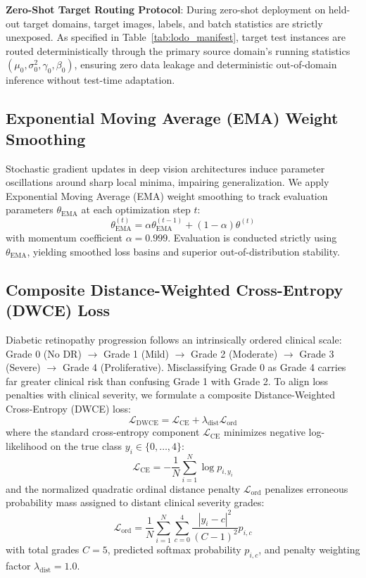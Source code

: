 \documentclass[conference]{IEEEtran}
\begin{document}
\textbf{Zero-Shot Target Routing Protocol}: During zero-shot deployment on held-out target domains, target images, labels, and batch statistics are strictly unexposed. As specified in Table~\ref{tab:lodo_manifest}, target test instances are routed deterministically through the primary source domain's running statistics $(\mu_0, \sigma_0^2, \gamma_0, \beta_0)$, ensuring zero data leakage and deterministic out-of-domain inference without test-time adaptation.

\subsection{Exponential Moving Average (EMA) Weight Smoothing}
Stochastic gradient updates in deep vision architectures induce parameter oscillations around sharp local minima, impairing generalization. We apply Exponential Moving Average (EMA) weight smoothing to track evaluation parameters $\theta_{\text{EMA}}$ at each optimization step $t$:
\begin{equation}
\theta_{\text{EMA}}^{(t)} = \alpha \theta_{\text{EMA}}^{(t-1)} + (1 - \alpha) \theta^{(t)}
\end{equation}
with momentum coefficient $\alpha = 0.999$. Evaluation is conducted strictly using $\theta_{\text{EMA}}$, yielding smoothed loss basins and superior out-of-distribution stability.

\subsection{Composite Distance-Weighted Cross-Entropy (DWCE) Loss}
Diabetic retinopathy progression follows an intrinsically ordered clinical scale: Grade 0 (No DR) $\rightarrow$ Grade 1 (Mild) $\rightarrow$ Grade 2 (Moderate) $\rightarrow$ Grade 3 (Severe) $\rightarrow$ Grade 4 (Proliferative). Misclassifying Grade 0 as Grade 4 carries far greater clinical risk than confusing Grade 1 with Grade 2. To align loss penalties with clinical severity, we formulate a composite Distance-Weighted Cross-Entropy (DWCE) loss:
\begin{equation}
    \mathcal{L}_{\text{DWCE}} = \mathcal{L}_{\text{CE}} + \lambda_{\text{dist}} \mathcal{L}_{\text{ord}}
    \label{eq:dwce_composite}
\end{equation}
where the standard cross-entropy component $\mathcal{L}_{\text{CE}}$ minimizes negative log-likelihood on the true class $y_i \in \{0, \dots, 4\}$:
\begin{equation}
    \mathcal{L}_{\text{CE}} = -\frac{1}{N} \sum_{i=1}^N \log p_{i, y_i}
\end{equation}
and the normalized quadratic ordinal distance penalty $\mathcal{L}_{\text{ord}}$ penalizes erroneous probability mass assigned to distant clinical severity grades:
\begin{equation}
    \mathcal{L}_{\text{ord}} = \frac{1}{N} \sum_{i=1}^N \sum_{c=0}^4 \frac{|y_i - c|^2}{(C - 1)^2} p_{i,c}
\end{equation}
with total grades $C = 5$, predicted softmax probability $p_{i,c}$, and penalty weighting factor $\lambda_{\text{dist}} = 1.0$.
\end{document}
